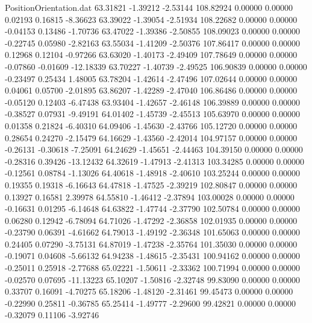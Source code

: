 \begin{filecontents}{PositionOrientation.dat}
  63.31821   -1.39212   -2.53144   108.82924    0.00000    0.00000    0.02193    0.16815   -8.36623
  63.39022   -1.39054   -2.51934   108.22682    0.00000    0.00000   -0.04153    0.13486   -1.70736
  63.47022   -1.39386   -2.50855   108.09023    0.00000    0.00000   -0.22745    0.05980   -2.82163
  63.55034   -1.41209   -2.50376   107.86417    0.00000    0.00000    0.12968    0.12104   -0.97266
  63.63020   -1.40173   -2.49409   107.78649    0.00000    0.00000   -0.07860   -0.01609  -12.18339
  63.70227   -1.40739   -2.49525   106.90839    0.00000    0.00000   -0.23497    0.25434    1.48005
  63.78204   -1.42614   -2.47496   107.02644    0.00000    0.00000    0.04061    0.05700   -2.01895
  63.86207   -1.42289   -2.47040   106.86486    0.00000    0.00000   -0.05120    0.12403   -6.47438
  63.93404   -1.42657   -2.46148   106.39889    0.00000    0.00000   -0.38527    0.07931   -9.49191
  64.01402   -1.45739   -2.45513   105.63970    0.00000    0.00000    0.01358    0.21824   -6.40310
  64.09406   -1.45630   -2.43766   105.12720    0.00000    0.00000    0.28654    0.24270   -2.15479
  64.16629   -1.43560   -2.42014   104.97157    0.00000    0.00000   -0.26131   -0.30618   -7.25091
  64.24629   -1.45651   -2.44463   104.39150    0.00000    0.00000   -0.28316    0.39426  -13.12432
  64.32619   -1.47913   -2.41313   103.34285    0.00000    0.00000   -0.12561    0.08784   -1.13026
  64.40618   -1.48918   -2.40610   103.25244    0.00000    0.00000    0.19355    0.19318   -6.16643
  64.47818   -1.47525   -2.39219   102.80847    0.00000    0.00000    0.13927    0.16581    2.39978
  64.55810   -1.46412   -2.37894   103.00028    0.00000    0.00000   -0.16631    0.01295   -6.14648
  64.63822   -1.47744   -2.37790   102.50784    0.00000    0.00000    0.06280    0.12942   -6.78094
  64.71026   -1.47292   -2.36858   102.01935    0.00000    0.00000   -0.23790    0.06391   -4.61662
  64.79013   -1.49192   -2.36348   101.65063    0.00000    0.00000    0.24405    0.07290   -3.75131
  64.87019   -1.47238   -2.35764   101.35030    0.00000    0.00000   -0.19071    0.04608   -5.66132
  64.94238   -1.48615   -2.35431   100.94162    0.00000    0.00000   -0.25011    0.25918   -2.77688
  65.02221   -1.50611   -2.33362   100.71994    0.00000    0.00000   -0.02570    0.07695  -11.13223
  65.10207   -1.50816   -2.32748    99.83090    0.00000    0.00000    0.33707    0.16091   -4.70275
  65.18206   -1.48120   -2.31461    99.45473    0.00000    0.00000   -0.22990    0.25811   -0.36785
  65.25414   -1.49777   -2.29600    99.42821    0.00000    0.00000   -0.32079    0.11106   -3.92746

\end{filecontents}
